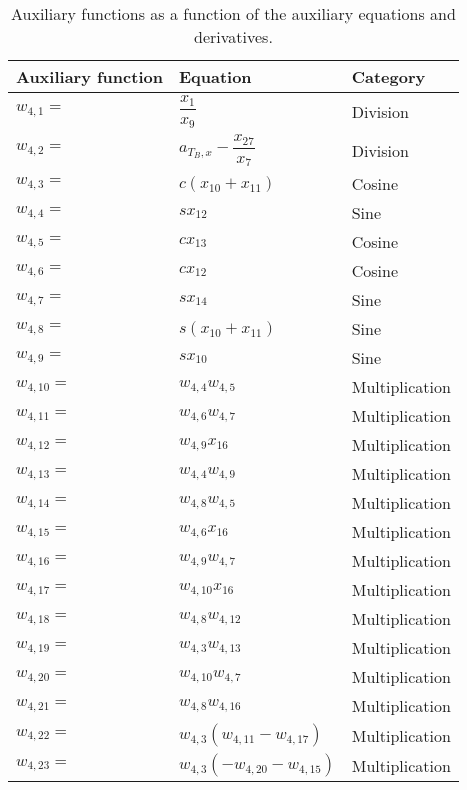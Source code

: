 \begin{longtable}{|p{1.5cm}|l|p{2cm}|}
\caption{Auxiliary functions as a function of the auxiliary equations and derivatives.}
\label{tab:auxFunc}
\endfirsthead
\endhead
\hline
\textbf{Auxiliary function} & \textbf{Equation} & \textbf{Category}  \\ \hline \hline
\hline 
$w_{4,1}=$  & $ \dfrac{x_{1}}{x_{9}} $ & Division \\ \hline
$w_{4,2}=$  & $ a_{T_{B},x}-\dfrac{x_{27}}{x_{7}} $ & Division \\ \hline
$w_{4,3}=$  & $ c\left(x_{10}+x_{11}\right) $ & Cosine  \\ \hline
$w_{4,4}=$  & $ sx_{12} $ & Sine \\ \hline
$w_{4,5}=$  & $ cx_{13} $ & Cosine  \\ \hline
$w_{4,6}=$  & $ cx_{12} $ & Cosine \\ \hline
$w_{4,7}=$  & $ sx_{14} $ & Sine \\ \hline
$w_{4,8}=$  & $ s\left(x_{10}+x_{11}\right) $ & Sine \\ \hline
$w_{4,9}=$ & $ sx_{10} $ & Sine \\ \hline
$w_{4,10}=$ & $ w_{4,4}w_{4,5} $ & Multiplication  \\ \hline
$w_{4,11}=$ & $ w_{4,6}w_{4,7} $ &  Multiplication \\ \hline
$w_{4,12}=$ & $ w_{4,9}x_{16} $ & Multiplication  \\ \hline
$w_{4,13}=$ & $ w_{4,4}w_{4,9} $ &  Multiplication \\ \hline
$w_{4,14}=$ & $ w_{4,8}w_{4,5} $ & Multiplication \\ \hline
$w_{4,15}=$ & $ w_{4,6}x_{16} $ &  Multiplication \\ \hline
$w_{4,16}=$ & $ w_{4,9}w_{4,7} $ & Multiplication  \\ \hline
$w_{4,17}=$ & $ w_{4,10}x_{16} $ & Multiplication \\ \hline
$w_{4,18}=$ & $ w_{4,8}w_{4,12} $ & Multiplication  \\ \hline
$w_{4,19}=$ & $ w_{4,3}w_{4,13} $ &  Multiplication \\ \hline
$w_{4,20}=$ & $ w_{4,10}w_{4,7} $ &  Multiplication \\ \hline
$w_{4,21}=$ & $ w_{4,8}w_{4,16} $ &  Multiplication \\ \hline
$w_{4,22}=$ & $ w_{4,3}\left(w_{4,11}-w_{4,17}\right) $ & Multiplication  \\ \hline
$w_{4,23}=$ & $ w_{4,3}\left(-w_{4,20}-w_{4,15}\right) $ &  Multiplication \\ \hline

\end{longtable}
